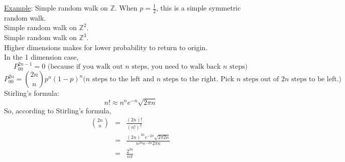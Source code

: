   \noindent\underline{Example}:
    Simple random walk on $\mathbb{Z}$. When $p = \frac{1}{2}$, this is
    a simple symmetric random walk.\\
    Simple random walk on $\mathbb{Z}^2$.\\
    Simple random walk on $\mathbb{Z}^3$.\\
    Higher dimensions makes for lower probability to return to origin.\\
    In the 1 dimension case, 
    $$
      P_{00}^{2n - 1} = 0 \text{ (because if you walk out $n$ steps, 
        you need to walk back $n$ steps)}
    $$
    $$
      P_{00}^{2n} = \binom{2n}{n}p^n(1 - p)^n \text{($n$ steps to the 
        left and $n$ steps to the right. Pick $n$ steps out of $2n$ 
        steps to be left.)}
    $$
    Stirling's formula:
    $$
      n! \approx n^ne^{-n} \sqrt{2\pi n}
    $$
    So, according to Stirling's formula,
    \begin{eqnarray*}
      \binom{2n}{n} & = & \frac{(2n)!}{(n!)^2}\\
        & = & \frac{(2n)^{2n}e^{-2n}\sqrt{2\pi2n}}{n^{2n} e^{-2n} 2\pi n}\\
        & = & \frac{2^{2n}}{n\pi}
    \end{eqnarray*}


